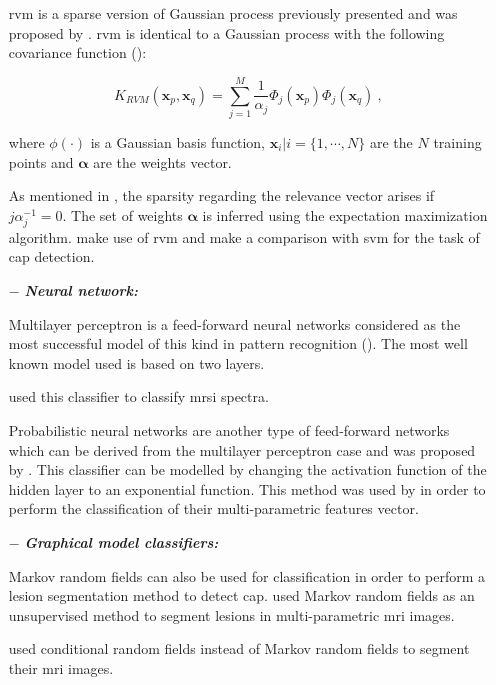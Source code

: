 \begin{enumerate}[leftmargin=*]
  \Acf{rvm} is a sparse version of Gaussian process previously presented and was proposed by \cite{Tipping2001}. \ac{rvm} is identical to a Gaussian process with the following covariance function (\cite{Quinonero-Candela2002}):

  \begin{equation}
    K_{RVM}(\mathbf{x}_p,\mathbf{x}_q) = \sum_{j=1}^{M} \frac{1}{\alpha_j} \Phi_j ( \mathbf{x}_p ) \Phi_j ( \mathbf{x}_q ) \ ,
    \label{eq:rvm}
  \end{equation}

  \noindent where $\phi(\cdot)$ is a Gaussian basis function, $\mathbf{x}_i|i=\{1,\cdots,N\}$ are the $N$ training points and $\boldsymbol{\alpha}$ are the weights vector.

  As mentioned in \cite{Quinonero-Candela2002}, the sparsity regarding the relevance vector arises if $j \alpha_j^{-1} = 0$. The set of weights $\boldsymbol{\alpha}$ is inferred using the expectation maximization algorithm. \cite{Ozer2009,Ozer2010} make use of \ac{rvm} and make a comparison with \ac{svm} for the task of \ac{cap} detection.

\item[$-$] \textbf{\textit{Neural network:}} 

  Multilayer perceptron is a feed-forward neural networks considered as the most successful model of this kind in pattern recognition (\cite{Bishop2006}). The most well known model used is based on two layers.
  
  \cite{Matulewicz2013,Parfait2012} used this classifier to classify \ac{mrsi} spectra.

  Probabilistic neural networks are another type of feed-forward networks which can be derived from the multilayer perceptron case and was proposed by \cite{Specht1988}. This classifier can be modelled by changing the activation function of the hidden layer to an exponential function. This method was used  by \cite{Ampeliotis2007,Ampeliotis2008,Viswanath2011} in order to perform the classification of their multi-parametric features vector.

\item[$-$] \textbf{\textit{Graphical model classifiers:}}

  Markov random fields can also be used for classification in order to perform a lesion segmentation method to detect \ac{cap}.\cite{Liu2009,Ozer2010} used Markov random fields as an unsupervised method to segment lesions in multi-parametric \ac{mri} images.

  \cite{Artan2009,Artan2010} used conditional random fields instead of Markov random fields to segment their \ac{mri} images.
\end{enumerate}

